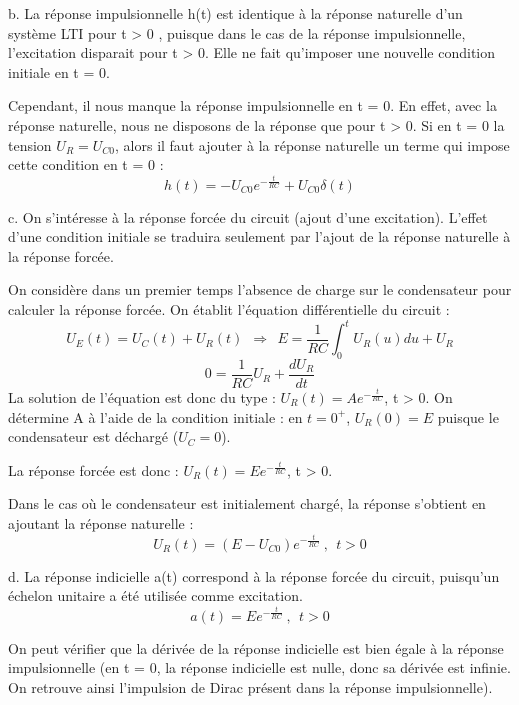 \documentclass[11pt]{report}
\begin{document}
 	b. La réponse impulsionnelle h(t) est identique à la réponse naturelle d'un système LTI pour t > 0 , puisque dans le cas de la réponse impulsionnelle, l'excitation disparait pour t > 0. Elle ne fait qu'imposer une nouvelle condition initiale en t = 0.
 	
 	Cependant, il nous manque la réponse impulsionnelle en t = 0. En effet, avec la réponse naturelle, nous ne disposons de la réponse que pour t > 0. Si en t = 0 la tension $U_R = U_{C0}$, alors il faut ajouter à la réponse naturelle un terme qui impose cette condition en t = 0 :
 	\begin{equation*}
 	h(t)=-U_{C0}e^{-\frac{t}{RC}}+U_{C0}\delta(t)
 	\end{equation*}
 	
 	c. On s'intéresse à la réponse forcée du circuit (ajout d'une excitation). L'effet d'une condition initiale se traduira seulement par l'ajout de la réponse naturelle à la réponse forcée. 
 	
 	On considère dans un premier temps l'absence de charge sur le condensateur pour calculer la réponse forcée. On établit l'équation différentielle du circuit :
 	\begin{equation*}
 	U_E(t)=U_C(t)+U_R(t)~~\Rightarrow~~E=\frac{1}{RC}\int_{0}^{t}U_R(u)du+U_R
 	\end{equation*}
 	\begin{equation*}
 	0=\frac{1}{RC}U_R+\frac{dU_R}{dt}
 	\end{equation*}
 	La solution de l'équation est donc du type : $U_R(t)=Ae^{-\frac{t}{RC}}$, t > 0. On détermine A à l'aide de la condition initiale : en $t = 0^+$, $U_R(0)=E$ puisque le condensateur est déchargé ($U_C=0$).
 	
 	La réponse forcée est donc :  $U_R(t)=Ee^{-\frac{t}{RC}}$, t > 0.
 	
 	Dans le cas où le condensateur est initialement chargé, la réponse s'obtient en ajoutant la réponse naturelle :
 	\begin{equation*}
 	U_R(t)=(E-U_{C0})e^{-\frac{t}{RC}}~,~~t>0
 	\end{equation*}
 	
 	d. La réponse indicielle a(t) correspond à la réponse forcée du circuit, puisqu'un échelon unitaire a été utilisée comme excitation.
 	\begin{equation*}
 	a(t)=Ee^{-\frac{t}{RC}}~,~~t>0
 	\end{equation*}
 	
 	On peut vérifier que la dérivée de la réponse indicielle est bien égale à la réponse impulsionnelle (en t = 0, la réponse indicielle est nulle, donc sa dérivée est infinie. On retrouve ainsi l'impulsion de Dirac présent dans la réponse impulsionnelle).
 	
\end{document}
